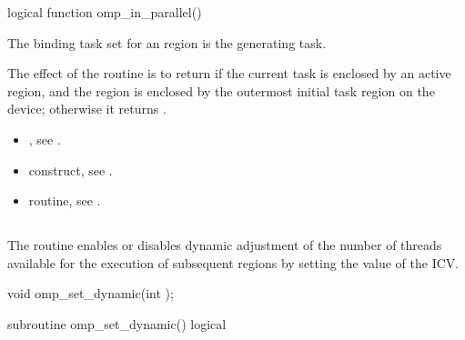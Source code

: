 \begin{fortranspecific}
\begin{ompfFunction}
logical function omp_in_parallel()
\end{ompfFunction}
\end{fortranspecific}

\binding
The binding task set for an  region is the generating task.

\effect
The effect of the  routine is to return  if the current task is 
enclosed by an active  region, and the  region is enclosed by the 
outermost initial task region on the device; otherwise it returns .

\crossreferences
\begin{itemize}
\item {}, see 
.

\item {} construct, see 
.

\item {} routine, see 
.
\end{itemize}








\bigskip
\subsection{}
\label{subsec:omp_set_dynamic}
\summary
The  routine enables or disables dynamic adjustment of the 
number of threads available for the execution of subsequent  regions by 
setting the value of the  ICV.


\pagebreak
\format
\begin{ccppspecific}
\begin{ompcFunction}
void omp_set_dynamic(int );
\end{ompcFunction}
\end{ccppspecific}
\bigskip

\begin{samepage}
\begin{fortranspecific}
\begin{ompfSubroutine}
subroutine omp_set_dynamic()
logical 
\end{ompfSubroutine}
\end{fortranspecific}
\end{samepage}

